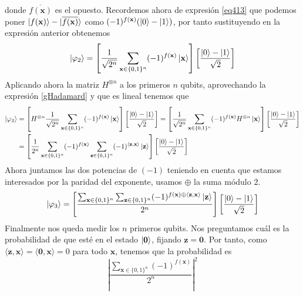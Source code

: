 \documentclass[a4paper]{article}
\numberwithin{equation}{section}
\begin{document}
donde $\overline{f(\mathbf{x})}$ es el opuesto. Recordemos ahora de expresión \ref{eq413} que podemos poner $\ket{f(\mathbf{x})} - \ket{\overline{f(\mathbf{x})}}$ como $(-1)^{f(\mathbf{x})}(\ket{0} - \ket{1})$, por tanto sustituyendo en la expresión anterior obtenemos
\begin{equation} \label{eq431}
\ket{\varphi_2} =
\left[ \frac{1}{\sqrt{2^n}} \sum_{\mathbf{x}\in\{ 0, 1\}^n} (-1)^{f(\mathbf{x})} \ket{\mathbf{x}} \right] \left[ \frac{\ket{0} - \ket{1}}{\sqrt{2}} \right]
\end{equation}
Aplicando ahora la matriz $H^{\otimes n}$ a los primeros $n$ qubits, aprovechando la expresión \ref{gHadamard} y que es lineal tenemos que
\begin{equation}
\begin{split}
\ket{\varphi_3} &=
\left[H^{\otimes n}\frac{1}{\sqrt{2^n}} \sum_{\mathbf{x}\in\{ 0, 1\}^n} (-1)^{f(\mathbf{x})} \ket{\mathbf{x}} \right] \left[ \frac{\ket{0} - \ket{1}}{\sqrt{2}} \right] =
\left[\frac{1}{\sqrt{2^n}} \sum_{\mathbf{x}\in\{ 0, 1\}^n} (-1)^{f(\mathbf{x})} H^{\otimes n}\ket{\mathbf{x}} \right] \left[ \frac{\ket{0} - \ket{1}}{\sqrt{2}} \right]
\\&=
\left[\frac{1}{2^n} \sum_{\mathbf{x}\in\{ 0, 1\}^n} (-1)^{f(\mathbf{x})} \sum_{\mathbf{z}\in\{ 0, 1\}^n} (-1)^{\langle \mathbf{z}, \mathbf{x} \rangle} \ket{\mathbf{z}} \right] \left[ \frac{\ket{0} - \ket{1}}{\sqrt{2}} \right]
\end{split} 
\end{equation}
Ahora juntamos las dos potencias de $(-1)$ teniendo en cuenta que estamos interesados por la paridad del exponente, usamos $\oplus$ la suma módulo $2$.
\begin{equation}
\ket{\varphi_3} =
\left[\frac{ \sum_{\mathbf{x}\in\{ 0, 1\}^n} \sum_{\mathbf{z}\in\{ 0, 1\}^n} (-1)^{f(\mathbf{x}) \oplus \langle \mathbf{z}, \mathbf{x} \rangle} \ket{\mathbf{z}} } {2^n} \right] \left[ \frac{\ket{0} - \ket{1}}{\sqrt{2}} \right]
\end{equation}
\newpage
Finalmente nos queda medir los $n$ primeros qubits. Nos preguntamos cuál es la probabilidad de que esté en el estado $\ket{\mathbf{0}}$, fijando $\mathbf{z} = \mathbf{0}$. Por tanto, como $\langle \mathbf{z}, \mathbf{x} \rangle = \langle \mathbf{0}, \mathbf{x} \rangle = 0$ para todo $\mathbf{x}$, tenemos que la probabilidad es
\begin{equation}
\left\vert \frac{\sum_{\mathbf{x}\in\{ 0, 1\}^n} (-1)^{f(\mathbf{x})}}{2^n} \right\vert^2 
\end{equation}
\end{document}
